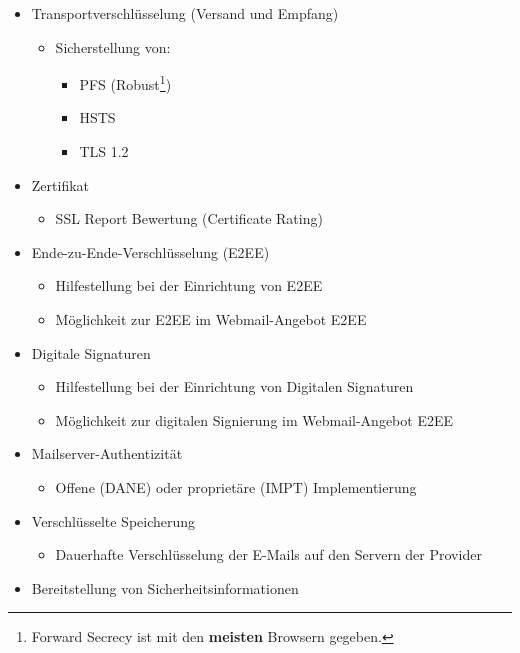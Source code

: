 \documentclass  [paper=a4,
				fontsize=12pt,
				listof=totoc,
				bibliography=totoc
				]{scrreprt}
\begin{document}
			\begin{smaller}
			\begin{itemize}
				\item Transportverschlüsselung (Versand und Empfang)
				\begin{itemize}
					\item Sicherstellung von: 
					\begin{itemize}
						\item \ac{PFS} (Robust\footnote{Forward Secrecy ist mit den \textbf{meisten} Browsern gegeben.})
						\item \acf{HSTS}
						\item \ac{TLS} 1.2
					\end{itemize}
				\end{itemize}
				\item Zertifikat
				\begin{itemize}
					\item SSL Report Bewertung (Certificate Rating)
				\end{itemize}
				\item Ende-zu-Ende-Verschlüsselung (E2EE)
				\begin{itemize}
					\item Hilfestellung bei der Einrichtung von \ac{E2EE}
					\item Möglichkeit zur \ac{E2EE} im Webmail-Angebot \ac{E2EE}
				\end{itemize}
				\item Digitale Signaturen
				\begin{itemize}
					\item Hilfestellung bei der Einrichtung von Digitalen Signaturen
					\item Möglichkeit zur digitalen Signierung im Webmail-Angebot \ac{E2EE}
				\end{itemize}				
				\item Mailserver-Authentizität
				\begin{itemize}
					\item Offene (\ac{DANE}) oder proprietäre (\acs{IMPT}) Implementierung 
				\end{itemize}\newpage	
				\item Verschlüsselte Speicherung 
				\begin{itemize}
					\item Dauerhafte Verschlüsselung der E-Mails auf den Servern der Provider
				\end{itemize}			
				\item Bereitstellung von Sicherheitsinformationen

\end{itemize}
\end{smaller}
\end{document}

